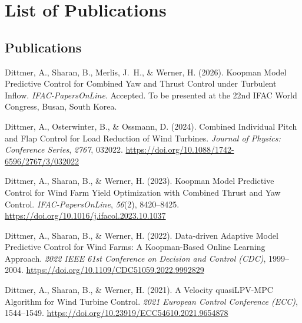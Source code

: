 \chapter*{List of Publications}
{}

\section*{Publications}

\begin{description}[leftmargin=0pt]
    
    \item Dittmer, A., Sharan, B., Merlis, J.~H., \& Werner, H. (2026).
    Koopman Model Predictive Control for Combined Yaw and Thrust Control
    under Turbulent Inflow.
    \textit{IFAC-PapersOnLine}.
    Accepted. To be presented at the 22nd IFAC World Congress, Busan, South Korea.
    
    \item Dittmer, A., Osterwinter, B., \& Ossmann, D. (2024).
    Combined Individual Pitch and Flap Control for Load Reduction
    of Wind Turbines.
    \textit{Journal of Physics: Conference Series}, \textit{2767}, 032022.
    \url{https://doi.org/10.1088/1742-6596/2767/3/032022}
    
    \item Dittmer, A., Sharan, B., \& Werner, H. (2023).
    Koopman Model Predictive Control for Wind Farm Yield Optimization
    with Combined Thrust and Yaw Control.
    \textit{IFAC-PapersOnLine}, \textit{56}(2), 8420--8425.
    \url{https://doi.org/10.1016/j.ifacol.2023.10.1037}
    
    \item Dittmer, A., Sharan, B., \& Werner, H. (2022).
    Data-driven Adaptive Model Predictive Control for Wind Farms:
    A Koopman-Based Online Learning Approach.
    \textit{2022 IEEE 61st Conference on Decision and Control (CDC)}, 1999--2004.
    \url{https://doi.org/10.1109/CDC51059.2022.9992829}
    
    \item Dittmer, A., Sharan, B., \& Werner, H. (2021).
    A Velocity quasiLPV-MPC Algorithm for Wind Turbine Control.
    \textit{2021 European Control Conference (ECC)}, 1544--1549.
    \url{https://doi.org/10.23919/ECC54610.2021.9654878}
    
\end{description}

